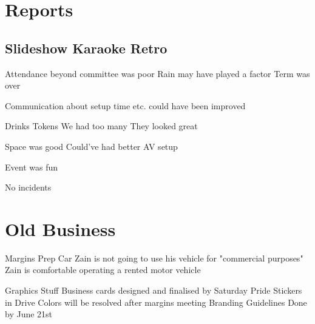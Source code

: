 \documentclass[11pt,hacksoc]{meetingmins}
\begin{document}
\maketitle

\section{Reports}

\subsection{Slideshow Karaoke Retro}
\begin{hiddensubitems}
  \item Attendance beyond committee was poor
    \subitem Rain may have played a factor
    \subitem Term was over
  \item Communication about setup time etc. could have been improved
  \item Drinks Tokens
    \subitem We had too many
    \subitem They looked great
  \item Space was good
    \subitem Could've had better AV setup
  \item Event was fun
  \item No incidents
\end{hiddensubitems}

\section{Old Business}
\begin{items}
  \item Margins Prep
    \subitem Car
      \subsubitem Zain is not going to use his vehicle for "commercial purposes"
      \subsubitem Zain is comfortable operating a rented motor vehicle
  \item Graphics Stuff
    \subitem Business cards designed and finalised by Saturday
    \subitem Pride Stickers in Drive
    \subitem Colors will be resolved after margins meeting
    \subitem Branding Guidelines Done by June 21st
\end{items}
\end{document}

